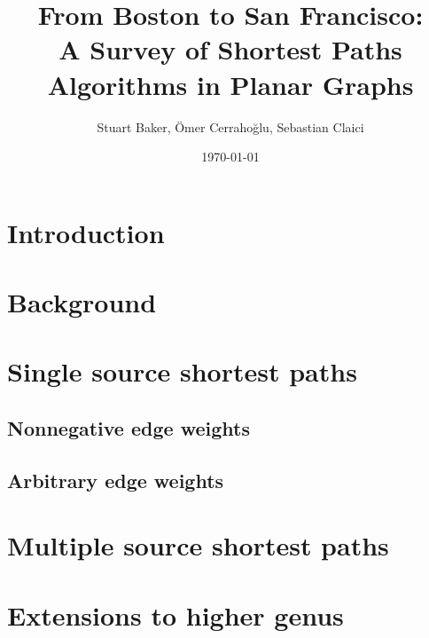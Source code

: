 \documentclass[12pt]{article}
\title{From Boston to San Francisco:\\ A Survey of Shortest Paths Algorithms in Planar Graphs}
\author{Stuart Baker, \"{O}mer Cerraho\u{g}lu, Sebastian Claici}
\date{\today}
\begin{document}
\maketitle

\begin{abstract}

\end{abstract}

\section{Introduction}
\label{sec:introduction}

\section{Background}
\label{sec:background}

\section{Single source shortest paths}
\label{sec:single-source-short}

\subsection{Nonnegative edge weights}
\label{sec:nonn-edge-weights}

\subsection{Arbitrary edge weights}
\label{sec:arbitr-edge-weights}

\section{Multiple source shortest paths}
\label{sec:mult-source-short}

\section{Extensions to higher genus}
\label{sec:extens-high-genus}




\end{document}
